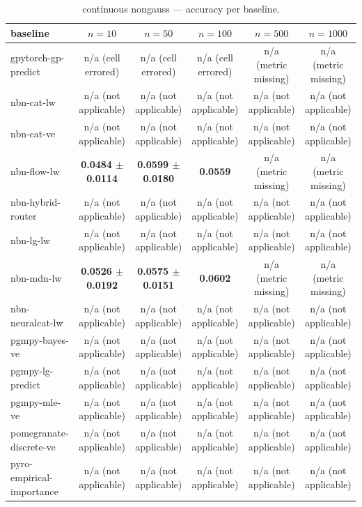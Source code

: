 \begin{table}[h]
\centering
\caption{continuous nongauss — accuracy per baseline.}
\label{tab:continuous_nongauss_accuracy}
\begin{tabular}{lccccc}
\toprule
baseline & $n=10$ & $n=50$ & $n=100$ & $n=500$ & $n=1000$ \\
\midrule
gpytorch-gp-predict & n/a (cell errored) & n/a (cell errored) & n/a (cell errored) & n/a (metric missing) & n/a (metric missing) \\
nbn-cat-lw & n/a (not applicable) & n/a (not applicable) & n/a (not applicable) & n/a (not applicable) & n/a (not applicable) \\
nbn-cat-ve & n/a (not applicable) & n/a (not applicable) & n/a (not applicable) & n/a (not applicable) & n/a (not applicable) \\
nbn-flow-lw & \textbf{0.0484 $\pm$ 0.0114} & \textbf{0.0599 $\pm$ 0.0180} & \textbf{0.0559} & n/a (metric missing) & n/a (metric missing) \\
nbn-hybrid-router & n/a (not applicable) & n/a (not applicable) & n/a (not applicable) & n/a (not applicable) & n/a (not applicable) \\
nbn-lg-lw & n/a (not applicable) & n/a (not applicable) & n/a (not applicable) & n/a (not applicable) & n/a (not applicable) \\
nbn-mdn-lw & \textbf{0.0526 $\pm$ 0.0192} & \textbf{0.0575 $\pm$ 0.0151} & \textbf{0.0602} & n/a (metric missing) & n/a (metric missing) \\
nbn-neuralcat-lw & n/a (not applicable) & n/a (not applicable) & n/a (not applicable) & n/a (not applicable) & n/a (not applicable) \\
pgmpy-bayes-ve & n/a (not applicable) & n/a (not applicable) & n/a (not applicable) & n/a (not applicable) & n/a (not applicable) \\
pgmpy-lg-predict & n/a (not applicable) & n/a (not applicable) & n/a (not applicable) & n/a (not applicable) & n/a (not applicable) \\
pgmpy-mle-ve & n/a (not applicable) & n/a (not applicable) & n/a (not applicable) & n/a (not applicable) & n/a (not applicable) \\
pomegranate-discrete-ve & n/a (not applicable) & n/a (not applicable) & n/a (not applicable) & n/a (not applicable) & n/a (not applicable) \\
pyro-empirical-importance & n/a (not applicable) & n/a (not applicable) & n/a (not applicable) & n/a (not applicable) & n/a (not applicable) \\
\bottomrule
\end{tabular}
\end{table}

